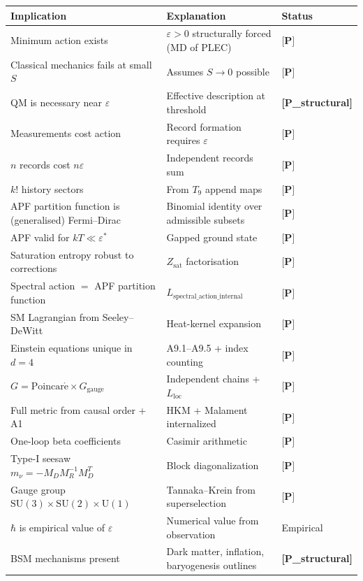 \documentclass[11pt]{article}
\newcommand{\SU}{\mathrm{SU}}
\newcommand{\U}{\mathrm{U}}
\newcommand{\epitag}[1]{\textbf{[#1]}}
\theoremstyle{definition}
\begin{document}
\begin{center}
\begin{tabular}{@{}lll@{}}
\toprule
\textbf{Implication} & \textbf{Explanation} & \textbf{Status} \\ \midrule
Minimum action exists & $\varepsilon > 0$ structurally forced (MD of PLEC) & $\epitag{P}$ \\
Classical mechanics fails at small $S$ & Assumes $S \to 0$ possible & $\epitag{P}$ \\
QM is necessary near $\varepsilon$ & Effective description at threshold & \epitag{P\_structural} \\
Measurements cost action & Record formation requires $\varepsilon$ & $\epitag{P}$ \\
$n$ records cost $n \varepsilon$ & Independent records sum & $\epitag{P}$ \\
$k!$ history sectors & From $T_9$ append maps & $\epitag{P}$ \\
APF partition function is (generalised) Fermi--Dirac & Binomial identity over admissible subsets & $\epitag{P}$ \\
APF valid for $kT \ll \varepsilon^*$ & Gapped ground state & $\epitag{P}$ \\
Saturation entropy robust to corrections & $Z_{\mathrm{sat}}$ factorisation & $\epitag{P}$ \\
Spectral action $=$ APF partition function & $L_{\mathrm{spectral\_action\_internal}}$ & $\epitag{P}$ \\
SM Lagrangian from Seeley--DeWitt & Heat-kernel expansion & $\epitag{P}$ \\
Einstein equations unique in $d=4$ & A9.1--A9.5 + index counting & $\epitag{P}$ \\
$G = \mathrm{Poincar\acute{e}} \times G_{\mathrm{gauge}}$ & Independent chains + $L_{\mathrm{loc}}$ & $\epitag{P}$ \\
Full metric from causal order + A1 & HKM + Malament internalized & $\epitag{P}$ \\
One-loop beta coefficients & Casimir arithmetic & $\epitag{P}$ \\
Type-I seesaw $m_\nu = -M_D M_R^{-1} M_D^T$ & Block diagonalization & $\epitag{P}$ \\
Gauge group $\SU(3) \times \SU(2) \times \U(1)$ & Tannaka--Krein from superselection & $\epitag{P}$ \\
$\hbar$ is empirical value of $\varepsilon$ & Numerical value from observation & Empirical \\
BSM mechanisms present & Dark matter, inflation, baryogenesis outlines & \epitag{P\_structural} \\
\bottomrule
\end{tabular}
\end{center}
\end{document}
